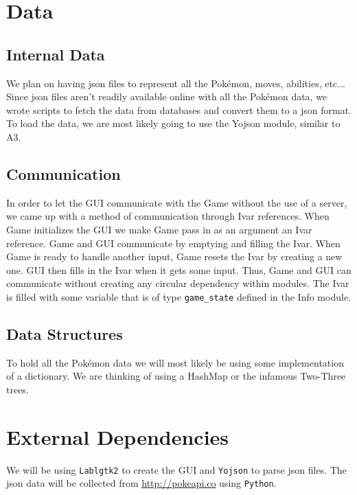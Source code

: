 \documentclass{scrreprt}
\begin{document}
\section{Data}
\subsection{Internal Data}
We plan on having json files to represent all the Pok\'emon, moves, abilities, etc... Since json files aren't readily available online with all the Pok\'emon data, we wrote scripts to fetch the data from databases and convert them to a json format. To load the data, we are most likely going to use the Yojson module, similar to A3. 

\subsection{Communication}
In order to let the GUI communicate with the Game without the use of a server, we came up with a method of communication through Ivar references. When Game initializes the GUI we make Game pass in as an argument an Ivar reference. Game and GUI communicate by emptying and filling the Ivar. When Game is ready to handle another input, Game resets the Ivar by creating a new one. GUI then fills in the Ivar when it gets some input. Thus, Game and GUI can communicate without creating any circular dependency within modules. The Ivar is filled with some variable that is of type \texttt{game\_state} defined in the Info module. 

\subsection{Data Structures}
To hold all the Pok\'emon data we will most likely be using some implementation of a dictionary. We are thinking of using a HashMap or the infamous Two-Three trees.

\section{External Dependencies}
We will be using \texttt{Lablgtk2} to create the GUI and \texttt{Yojson} to parse json files. The json data
will be collected from \url{http://pokeapi.co} using \texttt{Python}.

\end{document}
